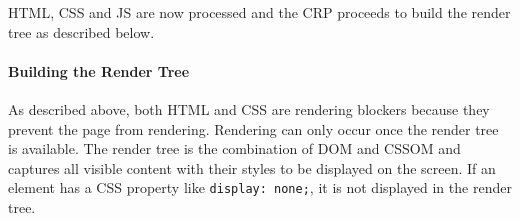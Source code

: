 



HTML, CSS and JS are now processed and the CRP proceeds to build the render tree as described below.












\paragraph{Building the Render Tree} %


As described above, both HTML and CSS are rendering blockers because they prevent the page from rendering.
Rendering can only occur once the render tree is available.
The render tree is the combination of DOM and CSSOM and captures all visible content with their styles to be displayed on the screen.
If an element has a CSS property like \verb|display: none;|, it is not displayed in the render tree. %

